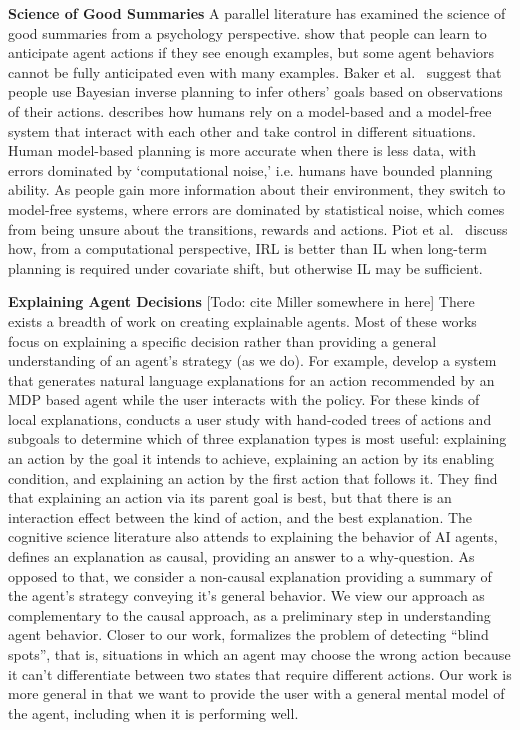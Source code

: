 \documentclass{article}
\begin{document}
\textbf{Science of Good Summaries}
A parallel literature has examined the science of good summaries from a psychology perspective. \cite{dragan2014familiarization} show that people can learn to anticipate agent actions if they see enough examples, but some agent behaviors cannot be fully anticipated even with many examples. Baker et al.~\cite{baker2009action} suggest that people use Bayesian inverse planning to infer others' goals based on observations of their actions. \cite{gershman2017reinforcement} describes how humans rely on a model-based and a model-free system that interact with each other and take control in different situations. Human model-based planning is more accurate when there is less data, with errors dominated by `computational noise,' i.e. humans have bounded planning ability. As people gain more information about their environment, they switch to model-free systems, where errors are dominated by statistical noise, which comes from being unsure about the transitions, rewards and actions. Piot et al.~\cite{piot2013} discuss how, from a computational perspective, IRL is better than IL when long-term planning is required under covariate shift, but otherwise IL may be sufficient. 

\textbf{Explaining Agent Decisions} [Todo: cite Miller somewhere in here]
There exists a breadth of work on creating explainable agents. Most of these works \cite{khan2009minimal,lomas2012explaining,dodson2011natural,broekens2010explain} focus on explaining a specific decision rather than providing a general understanding of an agent's strategy (as we do). For example, \cite{dodson2011natural} develop a system that generates natural language explanations for an action recommended by an MDP based agent while the user interacts with the policy. For these kinds of local explanations, \cite{broekens2010explain} conducts a user study with hand-coded trees of actions and subgoals to determine which of three explanation types is most useful: explaining an action by the goal it intends to achieve, explaining an action by its enabling condition, and explaining an action by the first action that follows it. They find that explaining an action via its parent goal is best, but that there is an interaction effect between the kind of action, and the best explanation. The cognitive science literature also attends to explaining the behavior of AI agents, \cite{miller2018explanation} defines an explanation as causal, providing an answer to a why-question. As opposed to that, we consider a non-causal explanation providing a summary of the agent's strategy conveying it's general behavior. We view our approach as complementary to the causal approach, as a preliminary step in understanding agent behavior. Closer to our work, \cite{ramakrishnan2018blindspot} formalizes the problem of detecting ``blind spots'', that is, situations in which an agent may choose the wrong action because it can't differentiate between two states that require different actions. Our work is more general in that we want to provide the user with a general mental model of the agent, including when it is performing well.
\end{document}
